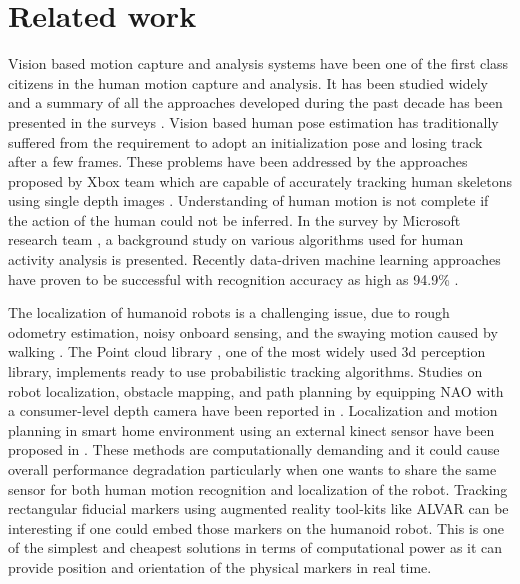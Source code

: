 \documentclass{llncs}
\begin{document}
\section{Related work}
\quad Vision based motion capture and analysis systems have been one of the first class citizens in the human motion capture and analysis. It has been studied widely and a summary of all the approaches developed during the past decade has been presented in the surveys \cite{moeslund2006survey}\cite{poppe2007vision}. Vision based human pose estimation has traditionally suffered from the requirement to adopt an initialization pose and losing track after a few frames. These problems have been addressed by the approaches proposed by Xbox \cite{Kinect2014} team which are capable of accurately tracking human skeletons using single depth images \cite{shotton2013efficient}. Understanding of human motion is not complete if the action of the human could not be inferred. In the survey by Microsoft research team \cite{han2013enhanced}, a background study on various algorithms used for human activity analysis is presented. Recently data-driven machine learning approaches have proven to be successful with recognition accuracy as high as 94.9\% \cite{Kinect2014}.
	
	The localization of humanoid robots is a challenging issue, due to rough odometry estimation, noisy onboard sensing, and the swaying motion caused by walking \cite{cervera2012localization}. The Point cloud library \cite{rusu20113d}, one of the most widely used 3d perception library, implements ready to use probabilistic tracking algorithms. Studies on robot localization, obstacle mapping, and path planning by equipping NAO with a consumer-level depth camera have been reported in \cite{maier2012real}. Localization and motion planning in smart home environment using an external kinect sensor have been proposed in \cite{cervera2012localization}. These methods are computationally demanding and it could cause overall performance degradation particularly when one wants to share the same sensor for both human motion recognition and localization of the robot. Tracking rectangular fiducial markers using augmented reality tool-kits like ALVAR \cite{ALVAR} can be interesting if one could embed those markers on the humanoid robot. This is one of the simplest and cheapest solutions in terms of computational power as it can provide position and orientation of the physical markers in real time.
	
\end{document}
